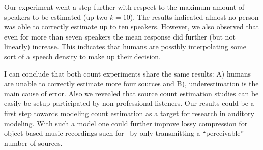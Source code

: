 Our experiment went a step further with respect to the maximum amount of speakers to be estimated (up two \(k=10\)).
The results indicated almost no person was able to correctly estimate up to ten speakers. 
However, we also observed that even for more than seven speakers the mean response did further (but not linearly) increase. 
This indicates that humans are possibly interpolating some sort of a speech density to make up their decision.
\par
I can conclude that both count experiments share the same results: A) humans are unable to correctly estimate more four sources and B), underestimation is the main cause of error.
Also we revealed that source count estimation studies can be easily be setup participated by non-professional listeners.
Our results could be a first step towards modeling count estimation as a target for research in auditory modeling. 
With such a model one could further improve lossy compression for object based music recordings such for~\cite{herre12saoc} by only transmitting a ``perceivable'' number of sources.

